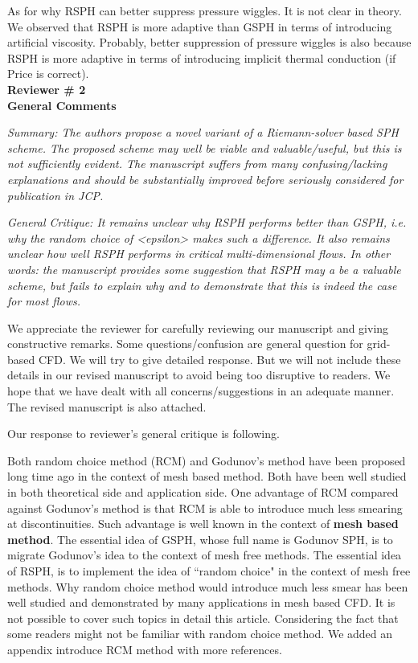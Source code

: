 \documentclass[10pt,a4paper]{article}
\begin{document}
As for why RSPH can better suppress pressure wiggles. It is not clear in theory. We observed that RSPH is more adaptive than GSPH in terms of introducing artificial viscosity. Probably, better suppression of pressure wiggles is also because RSPH is more adaptive in terms of introducing implicit thermal conduction (if Price is correct). 
\\[12pt]

\textbf{\Large Reviewer \# 2}\\[3pt]

\textbf{\large General Comments}

\textit{Summary: The authors propose a novel variant of a Riemann-solver based SPH scheme. The proposed scheme may well be viable and valuable/useful, but this is not sufficiently evident. The manuscript suffers from many confusing/lacking explanations and should be
substantially improved before seriously considered for publication in JCP.}

\textit{General Critique:
It remains unclear why RSPH performs better than GSPH, i.e. why the random choice of <epsilon> makes such a difference. It also remains unclear how well RSPH performs in critical multi-dimensional flows. In other words: the manuscript provides some suggestion that RSPH may a be a valuable scheme, but fails to explain why and to demonstrate that this is indeed the case for most flows.}

We appreciate the reviewer for carefully reviewing our manuscript and giving constructive remarks. Some questions/confusion are general question for grid-based CFD. We will try to give detailed response. But we will not include these details in our revised manuscript to avoid being too disruptive to readers. We hope that we have dealt with all concerns/suggestions in an adequate manner. The revised manuscript is also attached.

Our response to reviewer's general critique is following. 

Both random choice method (RCM) and Godunov's method have been proposed long time ago in the context of mesh based method. Both have been well studied in both theoretical side and application side. One advantage of RCM compared against Godunov's method is that RCM is able to introduce much less smearing at discontinuities. Such advantage is well known in the context of \textbf{mesh based method}.
The essential idea of GSPH, whose full name is Godunov SPH, is to migrate Godunov's idea to the context of mesh free methods. The essential idea of RSPH, is to implement the idea of ``random choice" in the context of mesh free methods. Why random choice method would introduce much less smear has been well studied and demonstrated by many applications in mesh based CFD. It is not possible to cover such topics in detail this article.
Considering the fact that some readers might not be familiar with random choice method. We added an appendix introduce RCM method with more references.
\end{document}
